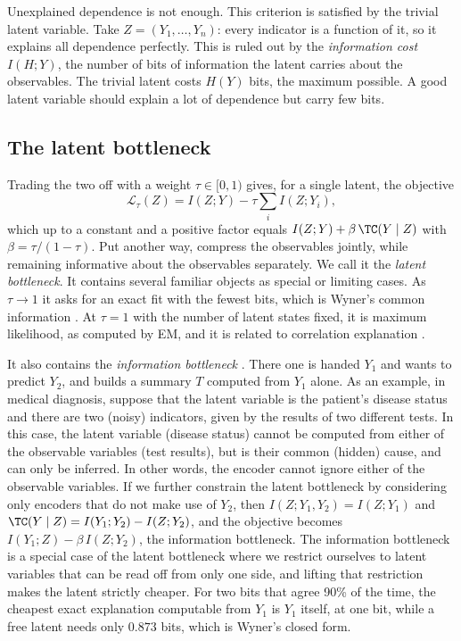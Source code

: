 \begin{draftblock}
Unexplained dependence is not enough. This criterion is satisfied by the trivial latent variable. Take $Z=(Y_1,\dots,Y_n)$: every indicator is a function of it, so it explains all dependence perfectly. This is ruled out by the \emph{information cost} $I(H;Y)$, the number of bits of information the latent carries about the observables. The trivial latent costs $H(Y)$ bits, the maximum possible. A good latent variable should explain a lot of dependence but carry few bits.

\subsection{The latent bottleneck}

Trading the two off with a weight $\tau\in[0,1)$ gives, for a single latent, the objective
\begin{equation}\label{arb:eq:bottleneck}
\mathcal L_\tau(Z)=I(Z;Y)-\tau\sum_iI(Z;Y_i),
\end{equation}
which up to a constant and a positive factor equals $I(Z;Y)+\beta\,\TC(Y\mid Z)$ with $\beta=\tau/(1-\tau)$. Put another way, compress the observables jointly, while remaining informative about the observables separately. We call it the \emph{latent bottleneck}. It contains several familiar objects as special or limiting cases. As $\tau\to1$ it asks for an exact fit with the fewest bits, which is Wyner's common information \citep{wynerCommonInformationTwo1975,gastparRelaxedWynersCommon2019}. At $\tau=1$ with the number of latent states fixed, it is maximum likelihood, as computed by EM, and it is related to correlation explanation \citep{versteegDiscoveringStructureHighdimensional2014}.

It also contains the \emph{information bottleneck} \citep{tishbyInformationBottleneckMethod1999}. There one is handed $Y_1$ and wants to predict $Y_2$, and builds a summary $T$ computed from $Y_1$ alone. As an example, in medical diagnosis, suppose that the latent variable is the patient's disease status and there are two (noisy) indicators, given by the results of two different tests. In this case, the latent variable (disease status) cannot be computed from either of the observable variables (test results), but is their common (hidden) cause, and can only be inferred. In other words, the encoder cannot ignore either of the observable variables. If we further constrain the latent bottleneck by considering only encoders that do not make use of $Y_2$, then $I(Z;Y_1,Y_2)=I(Z;Y_1)$ and $\TC(Y\mid Z)=I(Y_1;Y_2)-I(Z;Y_2)$, and the objective becomes $I(Y_1;Z)-\beta\,I(Z;Y_2)$, the information bottleneck. The information bottleneck is a special case of the latent bottleneck where we restrict ourselves to latent variables that can be read off from only one side, and lifting that restriction makes the latent strictly cheaper. For two bits that agree 90\% of the time, the cheapest exact explanation computable from $Y_1$ is $Y_1$ itself, at one bit, while a free latent needs only $0.873$ bits, which is Wyner's closed form.


\end{draftblock}
